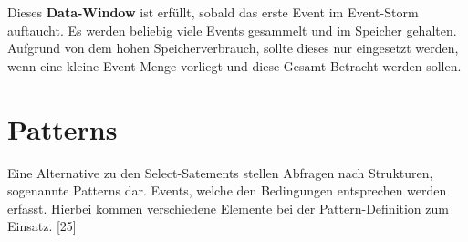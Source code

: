 Dieses \textbf{Data-Window} ist erfüllt, sobald das erste Event im Event-Storm auftaucht. Es werden beliebig viele Events gesammelt und im Speicher gehalten.
Aufgrund von dem hohen Speicherverbrauch, sollte dieses nur eingesetzt werden, wenn eine kleine Event-Menge vorliegt und diese Gesamt Betracht werden sollen.

\section{Patterns}

Eine Alternative zu den Select-Satements stellen Abfragen nach Strukturen, sogenannte Patterns dar. Events, welche den Bedingungen entsprechen werden erfasst. Hierbei kommen verschiedene Elemente bei der Pattern-Definition zum Einsatz.
\cite{EsperRef2018}[25]

